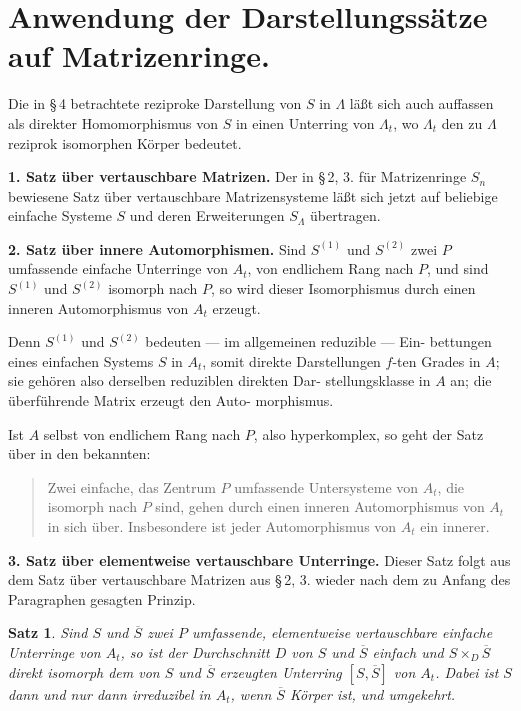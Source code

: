 \documentclass[12pt,a4paper]{article}
\theoremstyle{plain}
\newtheorem*{satz}{Satz}
\begin{document}
\section{Anwendung der Darstellungss\"atze auf Matrizenringe.}
\label{sec:matrizen}

Die in \S\,4 betrachtete reziproke Darstellung von $S$ in $\Lambda$ l\"a\ss t sich auch
auffassen als direkter Homomorphismus von $S$ in einen Unterring von $\Lambda_t$,
wo $\Lambda_t$ den zu $\Lambda$ reziprok isomorphen K\"orper bedeutet.

\medskip
\noindent\textbf{1. Satz \"uber vertauschbare Matrizen.}\hspace{0.5em}%
Der in \S\,2, 3. f\"ur Matrizenringe $S_n$ bewiesene Satz \"uber
vertauschbare Matrizensysteme l\"a\ss t sich jetzt auf beliebige einfache
Systeme $S$ und deren Erweiterungen $S_\Lambda$ \"ubertragen.

\medskip
\noindent\textbf{2. Satz \"uber innere Automorphismen.}\hspace{0.5em}%
Sind $S^{(1)}$ und $S^{(2)}$ zwei
$P$ umfassende einfache Unterringe von $A_t$, von endlichem Rang nach $P$,
und sind $S^{(1)}$ und $S^{(2)}$ isomorph nach $P$, so wird dieser Isomorphismus
durch einen inneren Automorphismus von $A_t$ erzeugt.

Denn $S^{(1)}$ und $S^{(2)}$ bedeuten --- im allgemeinen reduzible --- Ein-
bettungen eines einfachen Systems $S$ in $A_t$, somit direkte Darstellungen
$f$-ten Grades in $A$; sie geh\"oren also derselben reduziblen direkten Dar-
stellungsklasse in $A$ an; die \"uberf\"uhrende Matrix erzeugt den Auto-
morphismus.

Ist $A$ selbst von endlichem Rang nach $P$, also hyperkomplex, so
geht der Satz \"uber in den bekannten:

\begin{quote}
Zwei einfache, das Zentrum $P$ umfassende Untersysteme von $A_t$, die
isomorph nach $P$ sind, gehen durch einen inneren Automorphismus von $A_t$
in sich \"uber. Insbesondere ist jeder Automorphismus von $A_t$ ein innerer.
\end{quote}

\medskip
\noindent\textbf{3. Satz \"uber elementweise vertauschbare Unterringe.}\hspace{0.5em}%
Dieser
Satz folgt aus dem Satz \"uber vertauschbare Matrizen aus \S\,2, 3. wieder
nach dem zu Anfang des Paragraphen gesagten Prinzip.

\begin{satz}
Sind $S$ und $\overline{S}$ zwei $P$ umfassende, elementweise vertauschbare
einfache Unterringe von $A_t$, so ist der Durchschnitt $D$ von $S$ und
$\overline{S}$ einfach und $S \times_D \overline{S}$ direkt isomorph dem von $S$ und $\overline{S}$
erzeugten Unterring $[S, \overline{S}]$ von $A_t$. Dabei ist $S$ dann und nur
dann irreduzibel in $A_t$, wenn $\overline{S}$ K\"orper ist, und umgekehrt.
\end{satz}
\end{document}
